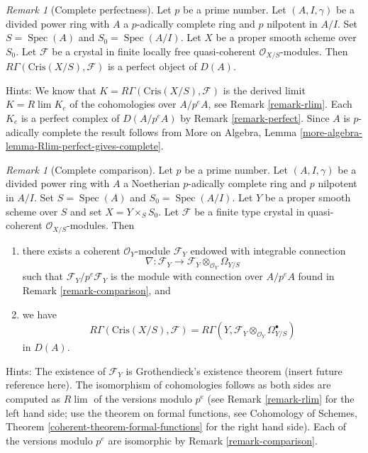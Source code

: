 \documentclass{stacks-project}
\theoremstyle{plain}
\theoremstyle{definition}
\theoremstyle{remark}
\newtheorem{remark}[subsection]{Remark}
\numberwithin{equation}{subsection}
\def\lim{\mathop{\mathrm{lim}}\nolimits}
\def\Spec{\mathop{\mathrm{Spec}}}
\begin{document}
\begin{remark}[Complete perfectness]
\label{remark-complete-perfect}
Let $p$ be a prime number. Let $(A, I, \gamma)$ be a divided power
ring with $A$ a $p$-adically complete ring and $p$ nilpotent in $A/I$. Set
$S = \Spec(A)$ and $S_0 = \Spec(A/I)$. Let $X$ be a proper
smooth scheme over $S_0$. Let $\mathcal{F}$ be a crystal in
finite locally free quasi-coherent $\mathcal{O}_{X/S}$-modules.
Then $R\Gamma(\text{Cris}(X/S), \mathcal{F})$ is a
perfect object of $D(A)$.

\medskip\noindent
Hints: We know that $K = R\Gamma(\text{Cris}(X/S), \mathcal{F})$
is the derived limit $K = R\lim K_e$ of the cohomologies over $A/p^eA$,
see Remark \ref{remark-rlim}.
Each $K_e$ is a perfect complex of $D(A/p^eA)$ by
Remark \ref{remark-perfect}.
Since $A$ is $p$-adically complete the result
follows from
More on Algebra, Lemma \ref{more-algebra-lemma-Rlim-perfect-gives-complete}.
\end{remark}

\begin{remark}[Complete comparison]
\label{remark-complete-comparison}
Let $p$ be a prime number. Let $(A, I, \gamma)$ be a divided power
ring with $A$ a Noetherian $p$-adically complete ring and $p$ nilpotent
in $A/I$. Set $S = \Spec(A)$ and
$S_0 = \Spec(A/I)$. Let $Y$ be a proper smooth scheme over $S$ and set
$X = Y \times_S S_0$. Let $\mathcal{F}$ be a finite type crystal in
quasi-coherent $\mathcal{O}_{X/S}$-modules. Then
\begin{enumerate}
\item there exists a coherent $\mathcal{O}_Y$-module $\mathcal{F}_Y$
endowed with integrable connection
$$
\nabla :
\mathcal{F}_Y
\longrightarrow
\mathcal{F}_Y \otimes_{\mathcal{O}_Y} \Omega_{Y/S}
$$
such that $\mathcal{F}_Y/p^e\mathcal{F}_Y$ is the module with connection
over $A/p^eA$ found in Remark \ref{remark-comparison}, and
\item we have
$$
R\Gamma(\text{Cris}(X/S), \mathcal{F}) =
R\Gamma(Y, \mathcal{F}_Y \otimes_{\mathcal{O}_Y} \Omega^\bullet_{Y/S})
$$
in $D(A)$.
\end{enumerate}
Hints: The existence of $\mathcal{F}_Y$ is Grothendieck's existence theorem
(insert future reference here). The isomorphism of cohomologies follows
as both sides are computed as $R\lim$ of the versions modulo $p^e$
(see Remark \ref{remark-rlim} for the left hand side; use the theorem
on formal functions, see
Cohomology of Schemes, Theorem \ref{coherent-theorem-formal-functions}
for the right hand side).
Each of the versions modulo $p^e$ are isomorphic by
Remark \ref{remark-comparison}.
\end{remark}
\end{document}
